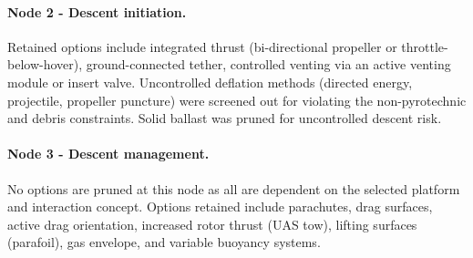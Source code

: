 \paragraph{Node 2 - Descent initiation.}
Retained options include integrated thrust (bi-directional
propeller or throttle-below-hover), ground-connected tether, controlled venting via an active venting module or insert valve. Uncontrolled deflation methods (directed energy, projectile, propeller puncture) were screened out for violating the non-pyrotechnic and debris constraints. Solid ballast was pruned for uncontrolled descent risk.
\vspace{-15pt}

\paragraph{Node 3 - Descent management.}
No options are pruned at this node as all are dependent on
the selected platform and interaction concept. Options
retained include parachutes, drag surfaces, active drag
orientation, increased rotor thrust (UAS tow), lifting
surfaces (parafoil), gas envelope, and variable buoyancy
systems.







